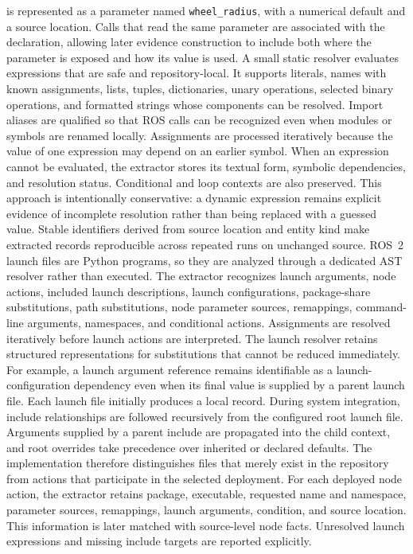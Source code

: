 is represented as a parameter named \texttt{wheel\_radius}, with a numerical default and a source location. Calls that read the same parameter are associated with the declaration, allowing later evidence construction to include both where the parameter is exposed and how its value is used.
A small static resolver evaluates expressions that are safe and repository-local. It supports literals, names with known assignments, lists, tuples, dictionaries, unary operations, selected binary operations, and formatted strings whose components can be resolved. Import aliases are qualified so that ROS calls can be recognized even when modules or symbols are renamed locally. Assignments are processed iteratively because the value of one expression may depend on an earlier symbol.
When an expression cannot be evaluated, the extractor stores its textual form, symbolic dependencies, and resolution status. Conditional and loop contexts are also preserved. This approach is intentionally conservative: a dynamic expression remains explicit evidence of incomplete resolution rather than being replaced with a guessed value. Stable identifiers derived from source location and entity kind make extracted records reproducible across repeated runs on unchanged source.
ROS~2 launch files are Python programs, so they are analyzed through a dedicated AST resolver rather than executed. The extractor recognizes launch arguments, node actions, included launch descriptions, launch configurations, package-share substitutions, path substitutions, node parameter sources, remappings, command-line arguments, namespaces, and conditional actions.
Assignments are resolved iteratively before launch actions are interpreted. The launch resolver retains structured representations for substitutions that cannot be reduced immediately. For example, a launch argument reference remains identifiable as a launch-configuration dependency even when its final value is supplied by a parent launch file.
Each launch file initially produces a local record. During system integration, include relationships are followed recursively from the configured root launch file. Arguments supplied by a parent include are propagated into the child context, and root overrides take precedence over inherited or declared defaults. The implementation therefore distinguishes files that merely exist in the repository from actions that participate in the selected deployment.
For each deployed node action, the extractor retains package, executable, requested name and namespace, parameter sources, remappings, launch arguments, condition, and source location. This information is later matched with source-level node facts. Unresolved launch expressions and missing include targets are reported explicitly.
